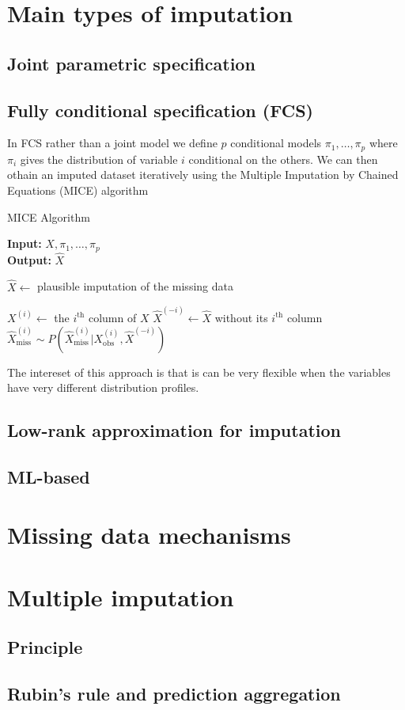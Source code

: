 

	\section{Main types of imputation}
		\subsection{Joint parametric specification}
		\subsection{Fully conditional specification (FCS)}
In FCS rather than a joint model we define $p$ conditional models $\pi_1, \ldots, \pi_p$ where $\pi_i$ gives the distribution of variable $i$ conditional on the others. We can then othain an imputed dataset iteratively using the Multiple Imputation by Chained Equations (MICE) algorithm \cite{MICE}
		\begin{algorithm}[H]
	\caption{MICE Algorithm}
	\hspace*{\algorithmicindent} \textbf{Input:} $X, \pi_1, \ldots, \pi_p$  \\
 	\hspace*{\algorithmicindent} \textbf{Output:} $\hat{X}$
	\begin{algorithmic}[1]
		\State $\hat{X} \leftarrow $ plausible imputation of the missing data

				\State $X^{(i)} \leftarrow $ the $i^{\text{th}}$ column of $X$
				\State $\hat{X}^{(-i)} \leftarrow \hat{X}$  without its $i^{\text{th}}$ column
				\State $\hat{X}^{(i)}_{\text{miss}} \sim P(\hat{X}^{(i)}_{\text{miss}} \vert {X}^{(i)}_{\text{obs}}, \hat{X}^{(-i)})$
			\EndFor
		\EndWhile
	\end{algorithmic}
\end{algorithm}

The intereset of this approach is that is can be very flexible when the variables have very different distribution profiles. 
		\subsection{Low-rank approximation for imputation}
		\subsection{ML-based}
	\section{Missing data mechanisms}
	\section{Multiple imputation}
		\subsection{Principle}
		\subsection{Rubin's rule and prediction aggregation}